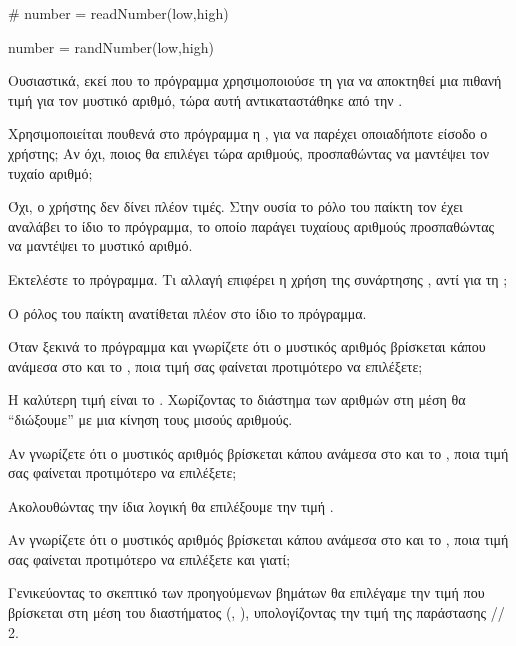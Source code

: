 \documentclass[a4paper,11pt,oneside]{book}
\begin{document}
\begin{step}
\begin{answer}
\clearpage
\begin{pyplain}
# number = readNumber(low,high)
\end{pyplain}
\begin{pynew}
number = randNumber(low,high)
\end{pynew}
\end{answer}

Ουσιαστικά, εκεί που το πρόγραμμα χρησιμοποιούσε τη  για να αποκτηθεί μια πιθανή τιμή για τον μυστικό αριθμό, τώρα αυτή αντικαταστάθηκε από την .

Χρησιμοποιείται πουθενά στο πρόγραμμα η , για να παρέχει οποιαδήποτε είσοδο ο χρήστης; Αν όχι, ποιος θα επιλέγει τώρα αριθμούς, προσπαθώντας να μαντέψει τον τυχαίο αριθμό;

\begin{answer}
Όχι, ο χρήστης δεν δίνει πλέον τιμές. Στην ουσία το ρόλο του παίκτη τον έχει αναλάβει το ίδιο το πρόγραμμα, το οποίο παράγει τυχαίους αριθμούς προσπαθώντας να μαντέψει το μυστικό αριθμό.
\end{answer}

Εκτελέστε το πρόγραμμα. Τι αλλαγή επιφέρει η χρήση της συνάρτησης , αντί για τη ;

\begin{answer}
Ο ρόλος του παίκτη ανατίθεται πλέον στο ίδιο το πρόγραμμα.
\end{answer}
\end{step}

\begin{step}
Όταν ξεκινά το πρόγραμμα και γνωρίζετε ότι ο μυστικός αριθμός βρίσκεται κάπου ανάμεσα στο  και το , ποια τιμή σας φαίνεται προτιμότερο να επιλέξετε;

\begin{answer}
Η καλύτερη τιμή είναι το . Χωρίζοντας το διάστημα των αριθμών στη μέση θα ``διώξουμε'' με μια κίνηση τους μισούς αριθμούς.
\end{answer}

Αν γνωρίζετε ότι ο μυστικός αριθμός βρίσκεται κάπου ανάμεσα στο  και το , ποια τιμή σας φαίνεται προτιμότερο να επιλέξετε;

\begin{answer}
Ακολουθώντας την ίδια λογική θα επιλέξουμε την τιμή .
\end{answer}

Αν γνωρίζετε ότι ο μυστικός αριθμός βρίσκεται κάπου ανάμεσα στο  και το , ποια τιμή σας φαίνεται προτιμότερο να επιλέξετε και γιατί;

\begin{answer}
Γενικεύοντας το σκεπτικό των προηγούμενων βημάτων θα επιλέγαμε την τιμή που βρίσκεται στη μέση του διαστήματος (, ), υπολογίζοντας την τιμή της παράστασης  // 2.
\end{answer}

\end{step}
\end{document}
